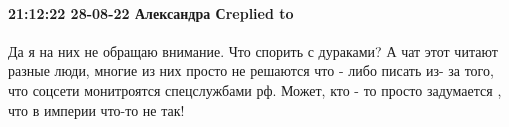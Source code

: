  
 
 
 
 

\paragraph{21:12:22 28-08-22 Александра Сreplied to 🐬}

Да я на них не обращаю внимание. Что спорить с дураками? А чат этот читают
разные люди, многие из них просто не решаются что - либо писать из- за того,
что соцсети монитроятся спецслужбами рф. Может, кто - то просто задумается ,
что в империи что-то не так!
